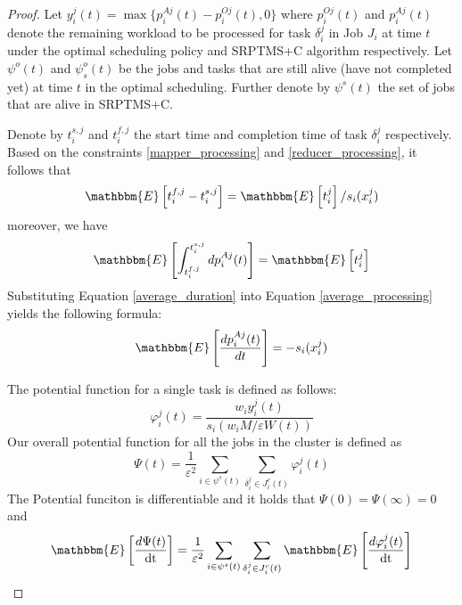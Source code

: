 \documentclass[10pt,conference,compsocconf,letterpaper]{IEEEtran}
\newcommand{\tmop}[1]{\ensuremath{\operatorname{#1}}}
\begin{document}
\begin{proof}
 Let $y^j_i (t) = \max \{ p_i^{A j} (t) - p_i^{O j} (t) , 0 \}$ where $p_i^{O j}
(t)$ and $p_i^{A j} (t)$ denote the remaining workload to be processed for task
$\delta^j_i$ in Job $J_i$ at time $t$ under the optimal scheduling policy and
SRPTMS+C algorithm respectively. Let $\psi^o (t)$ and $\psi^o_s (t)$ be the jobs and
tasks that are still alive (have not completed yet) at time $t$ in the optimal scheduling. Further
denote by $\psi^s (t)$ the set of jobs that are alive in SRPTMS+C.


Denote by $t^{s,j}_i$ and $t^{f,j}_i$ the start time and completion time of task $\delta^j_i$ respectively. Based on the constraints \eqref{mapper_processing} and \eqref{reducer_processing}, it follows that
\begin{equation}
\label{average_duration}
\mathbbm{E} \left[ t^{f,j}_i - t^{s,j}_i \right] = \mathbbm{E} \left[ t_i^{j} \right]/s_i(x_i^{j})
\end{equation}
moreover, we have
\begin{equation}
\label{average_processing}
\mathbbm{E} \left[\int_{t^{f,j}_i}^{t^{s,j}_i} d p_i^{A j} (t) \right] = \mathbbm{E} \left[ t_i^{j} \right]
\end{equation}
Substituting  Equation \eqref{average_duration} into Equation \eqref{average_processing} yields
the following formula:
\begin{equation}
\label{average_speed}
\mathbbm{E} \left[\frac{d p_i^{A j} (t)}{dt} \right] = -s_i(x_i^{j})
\end{equation}

The potential function for a single task is defined as follows:
\begin{equation}
  \varphi_i^j (t) = \frac{w_i y_i^j (t)}{s_i (w_i M / \varepsilon W (t))}
\end{equation}
Our overall potential function for all the jobs in the cluster is defined as
\begin{equation}
  \Psi (t) = \frac{1}{\varepsilon^2} \sum_{i \text{} \in \psi^s (t)}
  \sum_{\delta^j_i \in J_i^c (t)} \varphi_i^j (t)
\end{equation}
The Potential funciton is differentiable and it holds that $\Psi (0) = \Psi
(\infty) = 0$ and
\begin{equation}
  \mathbbm{E} \left[ \frac{d \Psi (t)}{\tmop{dt}} \right] =
  \frac{1}{\varepsilon^2} \sum_{i \text{} \in \psi^s (t)} \sum_{\delta^j_i \in
  J_i^c (t)} \mathbbm{E} \left[ \frac{d \varphi_i^j (t)}{\tmop{dt}} \right]
\end{equation}


\end{proof}
\end{document}
